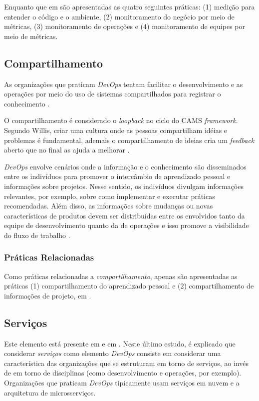 Enquanto que em \cite{characterizing_devops} são apresentadas as quatro
seguintes práticas: (1) medição para entender o código e o ambiente, (2)
monitoramento do negócio por meio de métricas, (3) monitoramento de operações
e (4) monitoramento de equipes por meio de métricas.

\subsection{Compartilhamento}

As organizações que praticam \textit{DevOps} tentam facilitar o desenvolvimento
e as operações por meio do uso de sistemas compartilhados para registrar o
conhecimento \cite{qualitative_devops_journalsw_17}.

O compartilhamento é considerado o \textit{loopback} no ciclo do \acrshort{CAMS}
\textit{framework}. Segundo Willis, criar uma cultura onde as pessoas
compartilham idéias e problemas é fundamental, ademais o compartilhamento de
ideias cria um \textit{feedback} aberto que no final as ajuda a melhorar
\cite{what_devops_means_2010}.

\textit{DevOps} envolve cenários onde a informação e o conhecimento são
disseminados entre os indivíduos para promover o intercâmbio de aprendizado
pessoal e informações sobre projetos. Nesse sentido, os indivíduos divulgam
informações relevantes, por exemplo, sobre como implementar e executar
práticas recomendadas. Além disso, as informações sobre mudanças ou novas
características de produtos devem ser distribuídas entre os envolvidos
tanto da equipe de desenvolvimento quanto da de operações e isso promove a
visibilidade do fluxo de trabalho \cite{characterizing_devops}.

\subsubsection{Práticas Relacionadas}

Como práticas relacionadas a \emph{compartilhamento}, apenas são apresentadas
as práticas (1) compartilhamento do aprendizado pessoal e (2) compartilhamento
de informações de projeto, em \cite{characterizing_devops}.

\subsection{Serviços}

Este elemento está presente em \cite{cooperation_dev_ops_esem_2014} e em
\cite{qualitative_devops_journalsw_17}. Neste último estudo, é explicado que
considerar \emph{serviços} como elemento \textit{DevOps} consiste em considerar
uma característica das organizações que se estruturam em torno de serviços,
ao invés de em torno de disciplinas (como desenvolvimento e operações, por
exemplo). Organizações que praticam \textit{DevOps}
tipicamente usam serviços em nuvem e a arquitetura de microsserviços.

